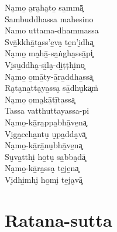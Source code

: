 \begin{paritta}
Na̮mo̱ a̮ra̮ha̮to̱ sa̱mmā͓\\
Sambuddhassa mahesino\\
Namo uttama-dhammassa\\
Svā̱kkhā̱ta̱ss'e̱va̮ te̱n'i̮dha͓\\
Na̮mo̱ ma̮hā̱-sa̱ṅgha̱ssā̱pi͓\\
Vi̮su̱ddha̮-sī̱la̮-di̱ṭṭhi̮no͓\\
Na̮mo̱ o̱mā̱ty-ā̱ra̱ddha̱ssa͓\\
Ra̮ta̮na̱tta̮ya̱ssa̮ sā̱dhu̮ka͓ṁ\\
Na̮mo̱ o̱ma̮kā̱tī̱ta̱ssa͓\\
Tassa vatthuttayassa-pi\\
Na̮mo̱-kā̱ra̱ppa̮bhā̱ve̱na͓\\
Vi̮ga̱ccha̱ntu̮ u̮pa̱dda̮vā͓\\
Na̮mo̱-kā̱rā̱nu̮bhā̱ve̱na͓\\
Su̮va̱tthi̮ ho̱tu̮ sa̱bba̮dā͓\\
Na̮mo̱-kā̱ra̱ssa̮ te̱je̱na͓\\
Vi̮dhi̱mhi̮ ho̱mi̮ te̱ja̮vā͓\\
\end{paritta}

\clearpage

\chapter{Ratana-sutta}


